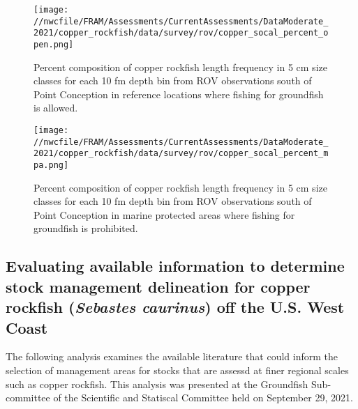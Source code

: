 \documentclass[11pt,
  english,
  a4paper,
]{article}
\begin{document}
\tagmcend\tagstructend

\clearpage


\begin{figure}
\centering
\texttt{[image: //nwcfile/FRAM/Assessments/CurrentAssessments/DataModerate\_2021/copper\_rockfish/data/survey/rov/copper\_socal\_percent\_open.png]}
\caption{Percent composition of copper rockfish length frequency in 5 cm size classes for each 10 fm depth bin from ROV observations south of Point Conception in reference locations where fishing for groundfish is allowed.\label{fig:rov-percent-open}}
\end{figure}

\tagmcend\tagstructend

\clearpage


\begin{figure}
\centering
\texttt{[image: //nwcfile/FRAM/Assessments/CurrentAssessments/DataModerate\_2021/copper\_rockfish/data/survey/rov/copper\_socal\_percent\_mpa.png]}
\caption{Percent composition of copper rockfish length frequency in 5 cm size classes for each 10 fm depth bin from ROV observations south of Point Conception in marine protected areas where fishing for groundfish is prohibited.\label{fig:rov-percent-mpa}}
\end{figure}

\tagmcend\tagstructend

\clearpage


\hypertarget{man-area}{%
\subsection{\texorpdfstring{Evaluating available information to determine stock management delineation for copper rockfish (\emph{Sebastes caurinus}) off the U.S. West Coast}{Evaluating available information to determine stock management delineation for copper rockfish (Sebastes caurinus) off the U.S. West Coast}}\label{man-area}}

\leavevmode\tagmcend\tagstructend


The following analysis examines the available literature that could inform the selection of management areas for stocks that are assessd at finer regional scales such as copper rockfish. This analysis was presented at the Groundfish Sub-committee of the Scientific and Statiscal Committee held on September 29, 2021.
\end{document}
